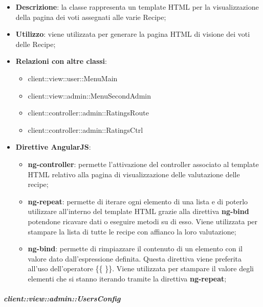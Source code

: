 			\begin{itemize}
				\item \textbf{Descrizione}: la classe rappresenta un template HTML per la visualizzazione della pagina dei voti assegnati alle varie Recipe;
				\item \textbf{Utilizzo}: viene utilizzata per generare la pagina HTML di visione dei voti delle Recipe;
				\item \textbf{Relazioni con altre classi}:
					\begin{itemize}
						\item client::view::user::MenuMain
						\item client::view::admin::MenuSecondAdmin
						\item client::controller::admin::RatingsRoute
						\item client::controller::admin::RatingsCtrl
					\end{itemize}
				\item \textbf{Direttive AngularJS}:
					\begin{itemize}
						\item \textbf{ng-controller}: permette l'attivazione del controller associato al template HTML relativo alla pagina di visualizzazione delle valutazione delle recipe;
						\item \textbf{ng-repeat}: permette di iterare ogni elemento di una lista e di poterlo utilizzare all'interno del template HTML grazie alla direttiva \textbf{ng-bind} potendone ricavare dati o eseguire metodi su di esso. Viene utilizzata per stampare la lista di tutte le recipe con affianco la loro valutazione;
						\item \textbf{ng-bind}: permette di rimpiazzare il contenuto di un elemento con il valore dato dall'espressione definita. Questa direttiva viene preferita all'uso dell'operatore \{\{ \}\}. Viene utilizzata per stampare il valore degli elementi che si stanno iterando tramite la direttiva \textbf{ng-repeat};
					\end{itemize}
			\end{itemize}

		\subparagraph{client::view::admin::UsersConfig} %
		\label{subp:bdsm_app_client_view_admin_usersconfig}


